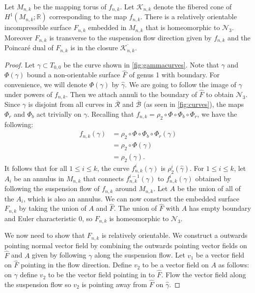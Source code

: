 \begin{prop}
\label{lem:genus3}
Let $M_{n,k}$ be the mapping torus of $f_{n,k}$. Let $\mathcal{K}_{n,k}$ denote the fibered cone of
$H^1(M_{n,k};\mathbb{R})$ corresponding to the map $f_{n,k}$.
There is a relatively orientable incompressible surface $F_{n,k}$ embedded in $M_{n,k}$ that is homeomorphic to $\mathcal{N}_3$.
Moreover $F_{n,k}$ is transverse to the suspension flow direction given by $f_{n,k}$ and the Poincar\'e dual of $F_{n,k}$ is in
the closure $\overline{\mathcal{K}_{n,k}}$.
\end{prop}
\begin{proof}
  Let $\gamma \subset T_{0,0}$ be the curve shown in \autoref{fig:gammacurves}. Note that $\gamma$ and $\Phi(\gamma)$ bound a non-orientable surface
  $\widehat{F}$ of genus 1 with boundary. For convenience, we will denote $\Phi(\gamma)$ by $\widehat{\gamma}$. We are going to follow the image of $\gamma$
  under powers of $f_{n,k}$.  Then we attach annuli to the
  boundary of $\widehat{F}$ to obtain $\mathcal{N}_3$. Since $\gamma$ is disjoint from all curves in $\overline{\mathcal{R}}$ and $\overline{\mathcal{B}}$ (as seen in \autoref{fig:curves}), the maps $\Phi_r$ and $\Phi_b$ act trivially on $\gamma$.  Recalling that $f_{n,k}=\rho_2\circ\Phi\circ\Phi_b\circ\Phi_r$, we have the following:
  \begin{align*}
    f_{n,k}(\gamma) &= \rho_2 \circ \Phi \circ \Phi_b \circ \Phi_r(\gamma) \\
                    &= \rho_2 \circ \Phi(\gamma) \\
                    &= \rho_2(\widehat{\gamma}).
  \end{align*}
  It follows that for all $1\leq i\leq k$, the curve $f_{n,k}^i(\gamma)$ is $\rho_2^i(\widehat{\gamma})$.
  For $1\leq i\leq k$, let $A_i$ be an annulus in $M_{n,k}$ that connects $f_{n,k}^{i-1}(\gamma)$ to $f_{n,k}^i(\gamma)$ obtained by following the suspension
  flow of $f_{n,k}$ around $M_{n,k}$. Let $A$ be the union of all of the $A_i$, which is also an annulus.  We can now construct the embedded surface $F_{n,k}$ by taking the union of
  $A$ and $\widehat{F}$. The union of $\widehat{F}$ with $A$ has empty boundary and Euler characteristic 0, so $F_{n,k}$ is homeomorphic to $\mathcal{N}_3$.

  We now need to show that $F_{n,k}$ is relatively orientable. We construct a outwards pointing normal vector field by combining the outwards pointing vector fields on $\widehat{F}$ and $A$ given by following $\gamma$ along the suspension flow.  Let $v_1$ be a vector field on $\widehat{F}$ pointing in the flow direction.  Define $v_2$ to be a vector field on $A$ as follows: on $\gamma$ define $v_2$ to be the vector field pointing in to $\widehat{F}$.  Flow the vector field along the suspension flow so $v_2$ is pointing away from $\widehat{F}$ on $\widehat{\gamma}$.


\end{proof}
